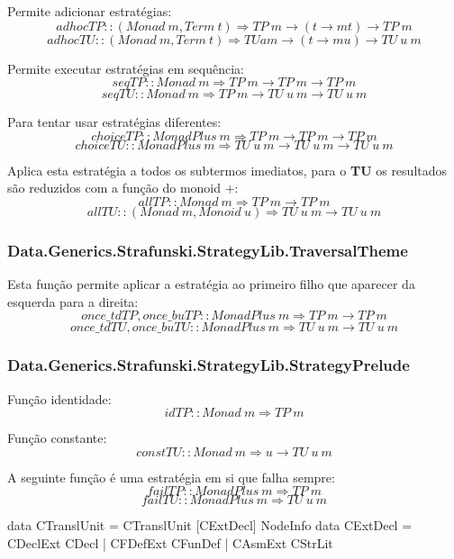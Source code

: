 Permite adicionar estratégias:
$$adhocTP :: (Monad~m, Term~t) \Rightarrow TP~m \rightarrow (t \rightarrow m t) \rightarrow TP~m$$
$$adhocTU :: (Monad~m, Term~t) \Rightarrow TU a m \rightarrow (t \rightarrow m u) \rightarrow TU~u~m$$

Permite executar estratégias em sequência:
$$seqTP :: Monad~m \Rightarrow TP~m \rightarrow TP~m \rightarrow TP~m$$
$$seqTU :: Monad~m \Rightarrow TP~m \rightarrow TU~u~m \rightarrow TU~u~m$$


Para tentar usar estratégias diferentes:
$$choiceTP :: MonadPlus~m \Rightarrow TP~m \rightarrow TP~m \rightarrow TP~m$$
$$choiceTU :: MonadPlus~m \Rightarrow TU~u~m \rightarrow TU~u~m \rightarrow TU~u~m$$

Aplica esta estratégia a todos os subtermos imediatos, para o \textbf{TU} os resultados são reduzidos com a função do monoid $+$:
$$allTP :: Monad~m \Rightarrow TP~m \rightarrow TP~m$$
$$allTU :: (Monad~m, Monoid~u) \Rightarrow TU~u~m \rightarrow TU~u~m$$

\subsubsection{Data.Generics.Strafunski.StrategyLib.TraversalTheme}

Esta função permite aplicar a estratégia ao primeiro filho que aparecer da esquerda para a direita:
$$once\_tdTP,once\_buTP :: MonadPlus~m \Rightarrow TP~m \rightarrow TP~m$$
$$once\_tdTU, once\_buTU :: MonadPlus~m \Rightarrow TU~u~m \rightarrow TU~u~m$$

\subsubsection{Data.Generics.Strafunski.StrategyLib.StrategyPrelude}

Função identidade:
$$idTP :: Monad~m \Rightarrow TP~m$$

Função constante:
$$constTU :: Monad~m \Rightarrow u \rightarrow TU~u~m$$

A seguinte função é uma estratégia em si que falha sempre:
$$failTP :: MonadPlus~m \Rightarrow TP~m$$
$$failTU :: MonadPlus~m \Rightarrow TU~u~m$$

\begin{haskell}
data CTranslUnit = CTranslUnit [CExtDecl] NodeInfo
data CExtDecl = CDeclExt CDecl
              | CFDefExt CFunDef
              | CAsmExt CStrLit
\end{haskell}

